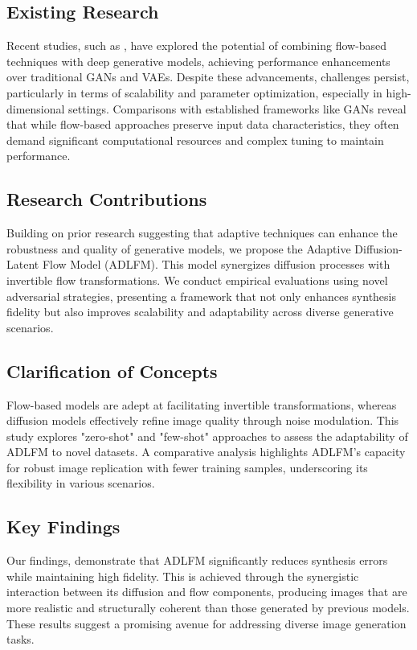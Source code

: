 \documentclass{article} %
\begin{document}
\subsection{Existing Research}
Recent studies, such as \citep{dinh2016density, kingma2018glow}, have explored the potential of combining flow-based techniques with deep generative models, achieving performance enhancements over traditional GANs and VAEs. Despite these advancements, challenges persist, particularly in terms of scalability and parameter optimization, especially in high-dimensional settings. Comparisons with established frameworks like GANs reveal that while flow-based approaches preserve input data characteristics, they often demand significant computational resources and complex tuning to maintain performance.

\subsection{Research Contributions}
Building on prior research suggesting that adaptive techniques can enhance the robustness and quality of generative models, we propose the Adaptive Diffusion-Latent Flow Model (ADLFM). This model synergizes diffusion processes with invertible flow transformations. We conduct empirical evaluations using novel adversarial strategies, presenting a framework that not only enhances synthesis fidelity but also improves scalability and adaptability across diverse generative scenarios.

\subsection{Clarification of Concepts}
Flow-based models are adept at facilitating invertible transformations, whereas diffusion models effectively refine image quality through noise modulation. This study explores "zero-shot" and "few-shot" approaches to assess the adaptability of ADLFM to novel datasets. A comparative analysis highlights ADLFM's capacity for robust image replication with fewer training samples, underscoring its flexibility in various scenarios.

\subsection{Key Findings}
Our findings, demonstrate that ADLFM significantly reduces synthesis errors while maintaining high fidelity. This is achieved through the synergistic interaction between its diffusion and flow components, producing images that are more realistic and structurally coherent than those generated by previous models. These results suggest a promising avenue for addressing diverse image generation tasks.
\end{document}
